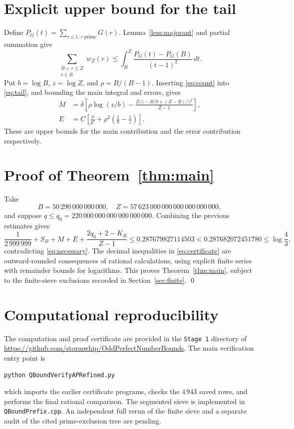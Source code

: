 \documentclass[11pt]{article}
\begin{document}
\section{Explicit upper bound for the tail}

Define \(P_G(t)=\sum_{r\le t,\ r\ \mathrm{prime}}G(r)\). Lemma~\ref{lem:majorant} and partial summation give
\begin{equation}\label{eq:tail}
\sum_{\substack{B<r\le Z\\r\in R}}w_Z(r)
\le \int_B^Z\frac{P_G(t)-P_G(B)}{(t-1)^2}\,dt.
\end{equation}
Put \(b=\log B\), \(z=\log Z\), and \(\rho=B/(B-1)\). Inserting \eqref{eq:count} into \eqref{eq:tail}, and bounding the main integral and errors, gives
\begin{align}
M&=\delta\left[\rho\log(z/b)
-\frac{Z/z-B/b+(Z-B)/z^2}{Z-1}\right],\label{eq:M}\\
E&=C\left[\frac{\rho}{b^2}
+\rho^2\left(\frac1b-\frac1z\right)\right].\label{eq:E}
\end{align}
These are upper bounds for the main contribution and the error contribution respectively.

\section{Proof of Theorem~\ref{thm:main}}

Take
\[
B=50\,290\,000\,000\,000,\quad
Z=57\,623\,000\,000\,000\,000\,000\,000,
\]
and suppose \(q\le q_0=220\,000\,000\,000\,000\,000\,000\). Combining the previous estimates gives
\begin{equation}\label{eq:certificate}
\frac1{2\,999\,999}+S_B+M+E+
\frac{2q_0+2-K_B}{Z-1}\le 0.287679827114503
<0.287682072451780\le\log\frac43,
\end{equation}
contradicting \eqref{eq:necessary}. The decimal inequalities in \eqref{eq:certificate} are outward-rounded consequences of rational calculations, using explicit finite series with remainder bounds for logarithms. This proves Theorem~\ref{thm:main}, subject to the finite-sieve exclusions recorded in Section~\ref{sec:finite}. \qed

\section{Computational reproducibility}

The computation and proof certificate are provided in the \texttt{Stage 1} directory of \url{https://github.com/stormwhip/OddPerfectNumberBounds}. The main verification entry point is
\begin{verbatim}
python QBoundVerifyAPRefined.py
\end{verbatim}
which imports the earlier certificate programs, checks the \(4\,943\) saved rows, and performs the final rational comparison. The segmented sieve is implemented in \texttt{QBoundPrefix.cpp}. An independent full rerun of the finite sieve and a separate audit of the cited prime-exclusion tree are pending.
\end{document}
